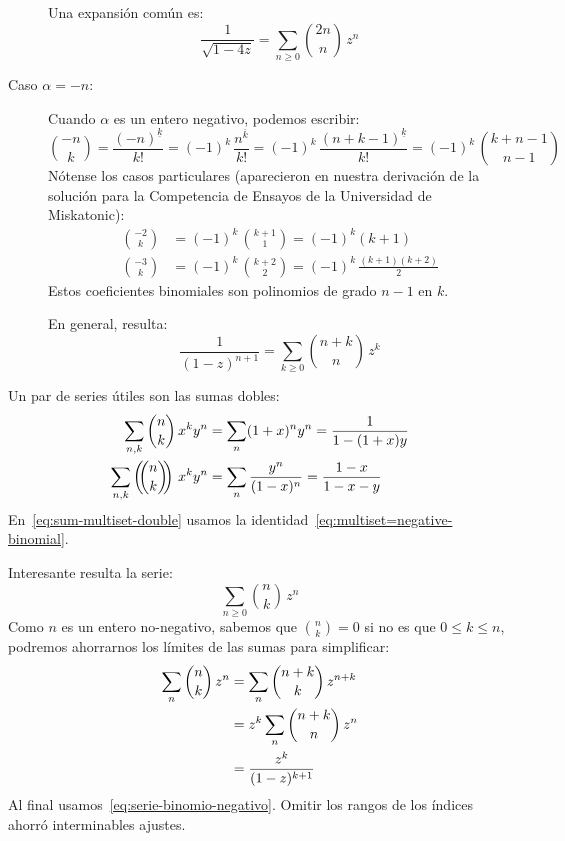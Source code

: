 \begin{description}
    Una expansión común es:
    \begin{equation}
      \label{eq:serie-reciproco-raiz}
      \frac{1}{\sqrt{1 - 4 z}}
	= \sum_{n \ge 0} \binom{2 n}{n} \, z^n
    \end{equation}
  \item[\boldmath Caso \(\alpha = -n\):\unboldmath]
    Cuando \(\alpha\) es un entero negativo,
    podemos escribir:
    \begin{equation}
      \label{eq:binomial(-n,k)}
      \binom{-n}{k}
	= \frac{(-n)^{\underline{k}}}{k!}
	= (-1)^k \, \frac{n^{\overline{k}}}{k!}
	= (-1)^k \, \frac{(n + k - 1)^{\underline{k}}}{k!}
	= (-1)^k \, \binom{k + n - 1}{n - 1}
    \end{equation}
    Nótense los casos particulares
    (aparecieron en nuestra derivación de la solución
     para la Competencia de Ensayos
     de la Universidad de Miskatonic):
    \begin{align*}
      \binom{-2}{k}
	&= (-1)^k \, \binom{k + 1}{1}
	 = (-1)^k (k + 1) \\
      \binom{-3}{k}
	&= (-1)^k \, \binom{k + 2}{2}
	 = (-1)^k \, \frac{(k + 1) (k + 2)}{2}
    \end{align*}
    Estos coeficientes binomiales
    son polinomios de grado \(n - 1\) en \(k\).

    En general,
    resulta:
    \begin{equation}
      \label{eq:serie-binomio-negativo}
      \frac{1}{(1 - z)^{n + 1}}
	= \sum_{k \ge 0} \binom{n + k}{n} \, z^k
    \end{equation}
  \end{description}
  Un par de series útiles son las sumas dobles:
  \begin{align}
    \label{eq:sum-binomial-double}
    \sum_{n, k} \binom{n}{k} \, x^k y^n
      &= \sum_{n} (1 + x)^n y^n
       = \frac{1}{1 - (1 + x) y} \\
    \label{eq:sum-multiset-double}
    \sum_{n, k} \left( \!\! \binom{n}{k} \!\! \right) \, x^k y^n
      &= \sum_{n} \frac{y^n}{(1 - x)^n}
       = \frac{1 - x}{1 - x - y}
  \end{align}
  En~\eqref{eq:sum-multiset-double}
  usamos la identidad~\eqref{eq:multiset=negative-binomial}.

  Interesante resulta la serie:
  \begin{equation*}
    \sum_{n \ge 0} \binom{n}{k} \, z^n
  \end{equation*}
  Como \(n\) es un entero no-negativo,
  sabemos que \(\binom{n}{k} = 0\) si no es que \(0 \le k \le n\),
  podremos ahorrarnos los límites de las sumas para simplificar:
  \begin{align}
    \sum_n \binom{n}{k} \, z^n
      &= \sum_n \binom{n + k}{k} \, z^{n + k} \notag \\
      &= z^k \sum_n \binom{n + k}{n} \, z^n \notag \\
      &= \frac{z^k}{(1 - z)^{k + 1}}
	    \label{eq:serie-binomio-n}
  \end{align}
  Al final usamos~\eqref{eq:serie-binomio-negativo}.
  Omitir los rangos de los índices ahorró interminables ajustes.

